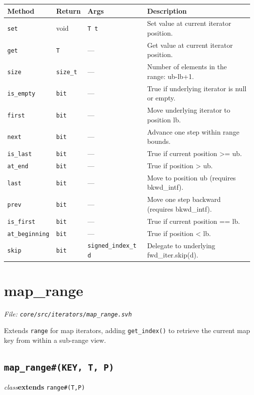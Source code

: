 \documentclass[11pt,letterpaper]{report}
\begin{document}
\begin{xltabular}{\linewidth}{>{\small}p{1.35in} >{\small}p{1.25in} >{\small}p{0.95in} >{\small}X}
\toprule
\textbf{Method} & \textbf{Return} & \textbf{Args} & \textbf{Description} \\
\midrule
\endhead
\bottomrule
\endfoot
\texttt{set} & void & \texttt{T t} & Set value at current iterator position. \\
\texttt{get} & \texttt{T} & --- & Get value at current iterator position. \\
\texttt{size} & \texttt{size\_t} & --- & Number of elements in the range: ub-lb+1. \\
\texttt{is\_empty} & \texttt{bit} & --- & True if underlying iterator is null or empty. \\
\texttt{first} & \texttt{bit} & --- & Move underlying iterator to position lb. \\
\texttt{next} & \texttt{bit} & --- & Advance one step within range bounds. \\
\texttt{is\_last} & \texttt{bit} & --- & True if current position \textgreater{}= ub. \\
\texttt{at\_end} & \texttt{bit} & --- & True if position \textgreater{} ub. \\
\texttt{last} & \texttt{bit} & --- & Move to position ub (requires bkwd\_intf). \\
\texttt{prev} & \texttt{bit} & --- & Move one step backward (requires bkwd\_intf). \\
\texttt{is\_first} & \texttt{bit} & --- & True if current position == lb. \\
\texttt{at\_beginning} & \texttt{bit} & --- & True if position \textless{} lb. \\
\texttt{skip} & \texttt{bit} & \texttt{signed\_index\_t d} & Delegate to underlying fwd\_iter.skip(d). \\
\end{xltabular}

\section{map\_range}
\noindent\small\textit{File: \texttt{core/src/iterators/map\_range.svh}}\par

Extends \texttt{range} for map iterators, adding \texttt{get\_index()} to retrieve the current map key from within a sub-range view.

\subsection*{\texttt{map\_range\#(KEY, T, P)}}
\noindent\small\textit{class}\quad \textbf{extends} \texttt{range\#(T,P)}\par
\end{document}
